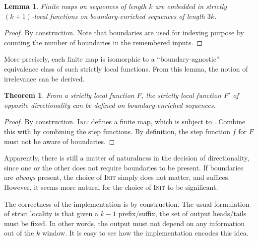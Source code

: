 \documentclass[11pt]{article}
\theoremstyle{definition}
\theoremstyle{plain}
\newtheorem{lemma}{Lemma}
\newtheorem{theorem}{Theorem}
\begin{document}
\begin{lemma}
  Finite maps on sequences of length \(k\) are embedded in strictly
  \((k+1)\)-local functions on boundary-enriched sequences of length
  \(3k\).
  \label{lem:fin-map-emb}
\end{lemma}

\begin{proof}
  By construction.  Note that boundaries are used for indexing purpose
  by counting the number of boundaries in the remembered inputs.
\end{proof}

More precisely, each finite map is isomorphic to a
\enquote{boundary-agnostic} equivalence class of such strictly local
functions.  From this lemma, the notion of irrelevance can be derived.

\begin{theorem}
  From a strictly local function \(F\), the strictly local function
  \(F'\) of opposite directionality can be defined on
  boundary-enriched sequences.
\end{theorem}

\begin{proof}
  By construction.  \textsc{Init} defines a finite map, which is
  subject to .  Combine this with
   by combining the step functions.  By
  definition, the step function \(f\) for \(F\) must not be aware of
  boundaries.
\end{proof}

Apparently, there is still a matter of naturalness in the decision of
directionality, since one or the other does not require boundaries to
be present.  If boundaries are \emph{always} present,
the choice of \textsc{Init} simply does not matter, and
 suffices.  However, it seems more
natural for the choice of \textsc{Init} to be significant.

The correctness of the implementation is by construction.  The usual
formulation of strict locality is that given a \(k-1\) prefix/suffix,
the set of output heads/tails must be fixed.  In other words, the
output must not depend on any information out of the \(k\) window.  It
is easy to see how the implementation encodes this idea.
\end{document}
